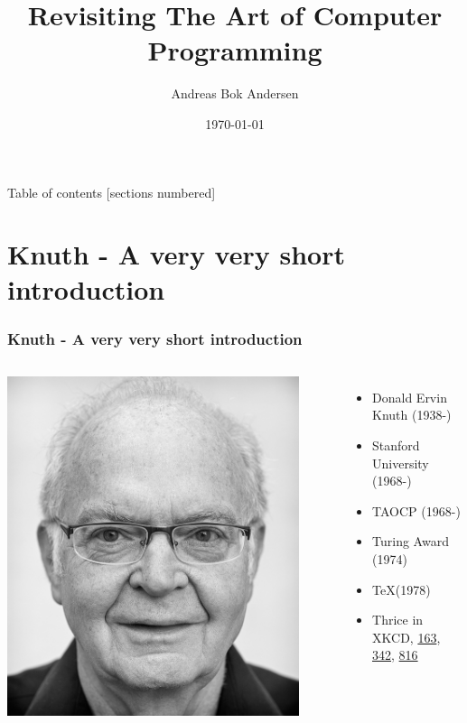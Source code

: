\documentclass[10pt]{beamer}
\title[RnD Summit Talk 2016]{Revisiting The Art of Computer Programming}
\date{\today}
\author{Andreas Bok Andersen}
\institute{Sociomantic GmbH}
\begin{document}
\maketitle

\begin{frame}{Table of contents}
  [sections numbered]
  \tableofcontents[hideallsubsections]
\end{frame}

\section{Knuth - A very very short introduction}

\begin{frame}
  \frametitle{Knuth - A very very short introduction}
  \begin{columns}[c]
      \includegraphics[width=0.9\textwidth]{./media/Knuth-A-small.jpg}
        \begin{itemize}[]
          \item<1-> Donald Ervin Knuth (1938-)
          \item<1-> Stanford University (1968-)
          \item<2-> TAOCP (1968-)
          \item<3-> Turing Award (1974)
          \item<4-> \TeX \phantom{a}(1978)
          \item<5-> Thrice in XKCD, \href{https://xkcd.com/163}{163}, \href{https://xkcd.com/342}{342}, \href{https://xkcd.com/816}{816}
        \end{itemize}
  \end{columns}
\end{frame}
\end{document}
